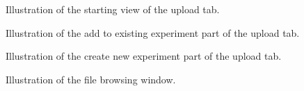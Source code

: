 \begin{figure}[h]
	\caption{Illustration of the starting view of the upload tab.}
	\label{fig:des_upload-tab}
\end{figure}

\begin{figure}[h]
	\caption{Illustration of the add to existing experiment part of the upload tab.}
	\label{fig:des_upload-exists}
\end{figure}

\begin{figure}[h]
	\caption{Illustration of the create new experiment part of the upload tab.}
	\label{fig:des_upload-new}
\end{figure}

\begin{figure}[h]
	\caption{Illustration of the file browsing window.}
	\label{fig:des_upload}
\end{figure}
\FloatBarrier

